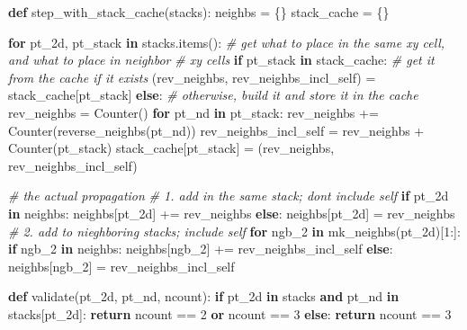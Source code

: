 \documentclass[]{article}
\newenvironment{Shaded}{}{}
\newcommand{\CommentTok}[1]{\textcolor[rgb]{0.38,0.63,0.69}{\textit{#1}}}
\newcommand{\ControlFlowTok}[1]{\textcolor[rgb]{0.00,0.44,0.13}{\textbf{#1}}}
\newcommand{\DecValTok}[1]{\textcolor[rgb]{0.25,0.63,0.44}{#1}}
\newcommand{\KeywordTok}[1]{\textcolor[rgb]{0.00,0.44,0.13}{\textbf{#1}}}
\newcommand{\NormalTok}[1]{#1}
\newcommand{\OperatorTok}[1]{\textcolor[rgb]{0.40,0.40,0.40}{#1}}
\begin{document}
\begin{Shaded}
\begin{Highlighting}[]
\KeywordTok{def}\NormalTok{ step\_with\_stack\_cache(stacks):}
\NormalTok{    neighbs }\OperatorTok{=}\NormalTok{ \{\}}
\NormalTok{    stack\_cache }\OperatorTok{=}\NormalTok{ \{\}}

    \ControlFlowTok{for}\NormalTok{ pt\_2d, pt\_stack }\KeywordTok{in}\NormalTok{ stacks.items():}
        \CommentTok{\# get what to place in the same xy cell, and what to place in neighbor}
        \CommentTok{\# xy cells}
        \ControlFlowTok{if}\NormalTok{ pt\_stack }\KeywordTok{in}\NormalTok{ stack\_cache:}
            \CommentTok{\# get it from the cache if it exists}
\NormalTok{            (rev\_neighbs, rev\_neighbs\_incl\_self) }\OperatorTok{=}\NormalTok{ stack\_cache[pt\_stack]}
        \ControlFlowTok{else}\NormalTok{:}
            \CommentTok{\# otherwise, build it and store it in the cache}
\NormalTok{            rev\_neighbs }\OperatorTok{=}\NormalTok{ Counter()}
            \ControlFlowTok{for}\NormalTok{ pt\_nd }\KeywordTok{in}\NormalTok{ pt\_stack:}
\NormalTok{                rev\_neighbs }\OperatorTok{+=}\NormalTok{ Counter(reverse\_neighbs(pt\_nd))}
\NormalTok{            rev\_neighbs\_incl\_self }\OperatorTok{=}\NormalTok{ rev\_neighbs }\OperatorTok{+}\NormalTok{ Counter(pt\_stack)}
\NormalTok{            stack\_cache[pt\_stack] }\OperatorTok{=}\NormalTok{ (rev\_neighbs, rev\_neighbs\_incl\_self)}

        \CommentTok{\# the actual propagation}
        \CommentTok{\# 1. add in the same stack; don\textquotesingle{}t include self}
        \ControlFlowTok{if}\NormalTok{ pt\_2d }\KeywordTok{in}\NormalTok{ neighbs:}
\NormalTok{            neighbs[pt\_2d] }\OperatorTok{+=}\NormalTok{ rev\_neighbs}
        \ControlFlowTok{else}\NormalTok{:}
\NormalTok{            neighbs[pt\_2d] }\OperatorTok{=}\NormalTok{ rev\_neighbs}
        \CommentTok{\# 2. add to nieghboring stacks; include self}
        \ControlFlowTok{for}\NormalTok{ ngb\_2 }\KeywordTok{in}\NormalTok{ mk\_neighbs(pt\_2d)[}\DecValTok{1}\NormalTok{:]:}
            \ControlFlowTok{if}\NormalTok{ ngb\_2 }\KeywordTok{in}\NormalTok{ neighbs:}
\NormalTok{                neighbs[ngb\_2] }\OperatorTok{+=}\NormalTok{ rev\_neighbs\_incl\_self}
            \ControlFlowTok{else}\NormalTok{:}
\NormalTok{                neighbs[ngb\_2] }\OperatorTok{=}\NormalTok{ rev\_neighbs\_incl\_self}

    \KeywordTok{def}\NormalTok{ validate(pt\_2d, pt\_nd, ncount):}
        \ControlFlowTok{if}\NormalTok{ pt\_2d }\KeywordTok{in}\NormalTok{ stacks }\KeywordTok{and}\NormalTok{ pt\_nd }\KeywordTok{in}\NormalTok{ stacks[pt\_2d]:}
            \ControlFlowTok{return}\NormalTok{ ncount }\OperatorTok{==} \DecValTok{2} \KeywordTok{or}\NormalTok{ ncount }\OperatorTok{==} \DecValTok{3}
        \ControlFlowTok{else}\NormalTok{:}
            \ControlFlowTok{return}\NormalTok{ ncount }\OperatorTok{==} \DecValTok{3}


\end{Highlighting}
\end{Shaded}
\end{document}
